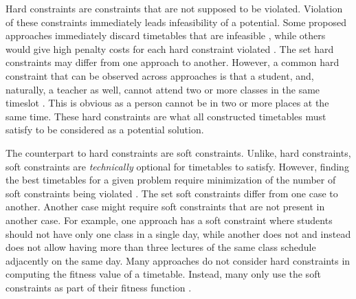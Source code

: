 Hard constraints are constraints that are not supposed to be violated. Violation of these constraints immediately leads infeasibility of a potential. Some proposed approaches immediately discard timetables that are infeasible \cite{nlgd-landa-silva}\cite{nlgdrl-obit}, while others would give high penalty costs for each hard constraint violated \cite{supachate-noval-approach-ga-thai}. The set hard constraints may differ from one approach to another. However, a common hard constraint that can be observed across approaches is that a student, and, naturally, a teacher as well, cannot attend two or more classes in the same timeslot \cite{nlgd-landa-silva}\cite{bedoya-non-standard-ga}. This is obvious as a person cannot be in two or more places at the same time. These hard constraints are what all constructed timetables must satisfy to be considered as a potential solution.

The counterpart to hard constraints are soft constraints. Unlike, hard constraints, soft constraints are \textit{technically} optional for timetables to satisfy. However, finding the best timetables for a given problem require minimization of the number of soft constraints being violated \cite{nlgd-landa-silva}. The set soft constraints differ from one case to another. Another case might require soft constraints that are not present in another case. For example, one approach \cite{nlgdrl-obit} has a soft constraint where students should not have only one class in a single day, while another \cite{supachate-noval-approach-ga-thai} does not and instead does not allow having more than three lectures of the same class schedule adjacently on the same day.	Many approaches do not consider hard constraints in computing the fitness value of a timetable. Instead, many only use the soft constraints as part of their fitness function \cite{sanjay-an-application-of-ga}\cite{nlgdrl-obit}\cite{bedoya-non-standard-ga}.

%
%
%
%
%